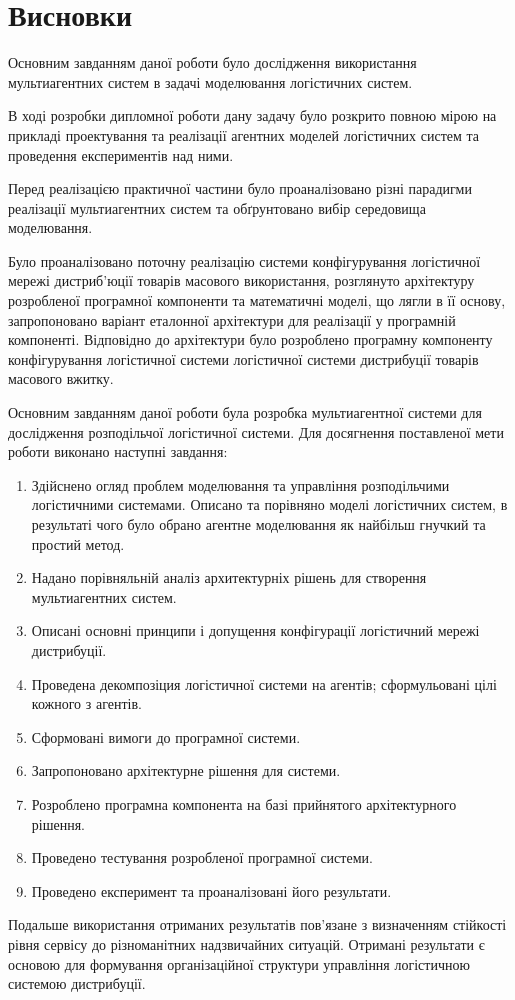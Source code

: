 \section*{Висновки}
Основним завданням даної роботи було дослідження використання мультиагентних систем в задачі моделювання логістичних систем.

В ході розробки дипломної роботи дану задачу було розкрито повною мірою на прикладі проектування та реалізації агентних моделей логістичних систем та проведення експериментів над ними. 

Перед реалізацією практичної частини було проаналізовано різні парадигми реалізації мультиагентних систем та обґрунтовано вибір середовища моделювання.

Було проаналізовано поточну реалізацію системи конфігурування логістичної мережі дистриб’юції товарів масового використання, розглянуто архітектуру розробленої програмної компоненти та математичні моделі, що лягли в її основу, запропоновано  варіант еталонної архітектури для реалізації у програмній компоненті. Відповідно до архітектури було розроблено програмну компоненту конфігурування логістичної системи логістичної системи дистрибуції товарів масового вжитку.

Основним завданням даної роботи була розробка мультиагентної системи для дослідження розподільчої логістичної системи.
Для досягнення поставленої мети роботи виконано наступні завдання:
\begin{enumerate}
    \item Здійснено огляд проблем моделювання та управління розподільчими логістичними системами. Описано та порівняно моделі логістичних систем, в результаті чого було обрано агентне моделювання як найбільш гнучкий та простий метод.
    \item Надано порівняльній аналіз архитектурніх рішень для створення мультиагентних систем.
    \item Описані основні принципи і допущення конфігурації логістичний мережі дистрибуції.
    \item Проведена декомпозіция логістичної системи на агентів; сформульовані цілі кожного з агентів.
	\item Сформовані вимоги до програмної системи.
	\item Запропоновано архітектурне рішення для системи.
	\item Розроблено програмна компонента на базі прийнятого архітектурного рішення.
	\item Проведено тестування розробленої програмної системи.
	\item Проведено експеримент та проаналізовані його результати.
\end{enumerate}

Подальше використання отриманих результатів пов'язане з визначенням стійкості рівня сервісу до різноманітних надзвичайних ситуацій. Отримані результати є основою для формування організаційної структури управління логістичною системою дистрибуції.
